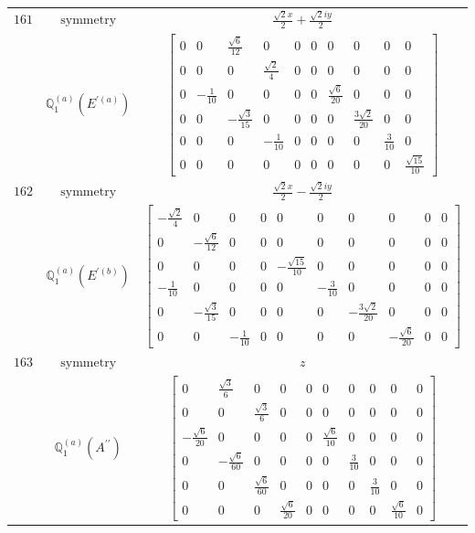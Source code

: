 \documentclass[fleqn,8pt,landscape]{jsarticle}
\begin{document}
\begin{longtable}{ccc}
$ 161 $ & $ \text{symmetry} $ & $ \frac{\sqrt{2} x}{2} + \frac{\sqrt{2} i y}{2} $ \\
$  $ & $ \mathbb{Q}_{1}^{(a)}(E^{\prime(a)}) $ & $ \begin{bmatrix} 0 & 0 & \frac{\sqrt{6}}{12} & 0 & 0 & 0 & 0 & 0 & 0 & 0 \\ 0 & 0 & 0 & \frac{\sqrt{2}}{4} & 0 & 0 & 0 & 0 & 0 & 0 \\ 0 & - \frac{1}{10} & 0 & 0 & 0 & 0 & \frac{\sqrt{6}}{20} & 0 & 0 & 0 \\ 0 & 0 & - \frac{\sqrt{3}}{15} & 0 & 0 & 0 & 0 & \frac{3 \sqrt{2}}{20} & 0 & 0 \\ 0 & 0 & 0 & - \frac{1}{10} & 0 & 0 & 0 & 0 & \frac{3}{10} & 0 \\ 0 & 0 & 0 & 0 & 0 & 0 & 0 & 0 & 0 & \frac{\sqrt{15}}{10} \end{bmatrix} $ \\ \hline
$ 162 $ & $ \text{symmetry} $ & $ \frac{\sqrt{2} x}{2} - \frac{\sqrt{2} i y}{2} $ \\
$  $ & $ \mathbb{Q}_{1}^{(a)}(E^{\prime(b)}) $ & $ \begin{bmatrix} - \frac{\sqrt{2}}{4} & 0 & 0 & 0 & 0 & 0 & 0 & 0 & 0 & 0 \\ 0 & - \frac{\sqrt{6}}{12} & 0 & 0 & 0 & 0 & 0 & 0 & 0 & 0 \\ 0 & 0 & 0 & 0 & - \frac{\sqrt{15}}{10} & 0 & 0 & 0 & 0 & 0 \\ - \frac{1}{10} & 0 & 0 & 0 & 0 & - \frac{3}{10} & 0 & 0 & 0 & 0 \\ 0 & - \frac{\sqrt{3}}{15} & 0 & 0 & 0 & 0 & - \frac{3 \sqrt{2}}{20} & 0 & 0 & 0 \\ 0 & 0 & - \frac{1}{10} & 0 & 0 & 0 & 0 & - \frac{\sqrt{6}}{20} & 0 & 0 \end{bmatrix} $ \\ \hline
$ 163 $ & $ \text{symmetry} $ & $ z $ \\
$  $ & $ \mathbb{Q}_{1}^{(a)}(A^{\prime\prime}) $ & $ \begin{bmatrix} 0 & \frac{\sqrt{3}}{6} & 0 & 0 & 0 & 0 & 0 & 0 & 0 & 0 \\ 0 & 0 & \frac{\sqrt{3}}{6} & 0 & 0 & 0 & 0 & 0 & 0 & 0 \\ - \frac{\sqrt{6}}{20} & 0 & 0 & 0 & 0 & \frac{\sqrt{6}}{10} & 0 & 0 & 0 & 0 \\ 0 & - \frac{\sqrt{6}}{60} & 0 & 0 & 0 & 0 & \frac{3}{10} & 0 & 0 & 0 \\ 0 & 0 & \frac{\sqrt{6}}{60} & 0 & 0 & 0 & 0 & \frac{3}{10} & 0 & 0 \\ 0 & 0 & 0 & \frac{\sqrt{6}}{20} & 0 & 0 & 0 & 0 & \frac{\sqrt{6}}{10} & 0 \end{bmatrix} $ \\ \hline

\end{longtable}
\end{document}
